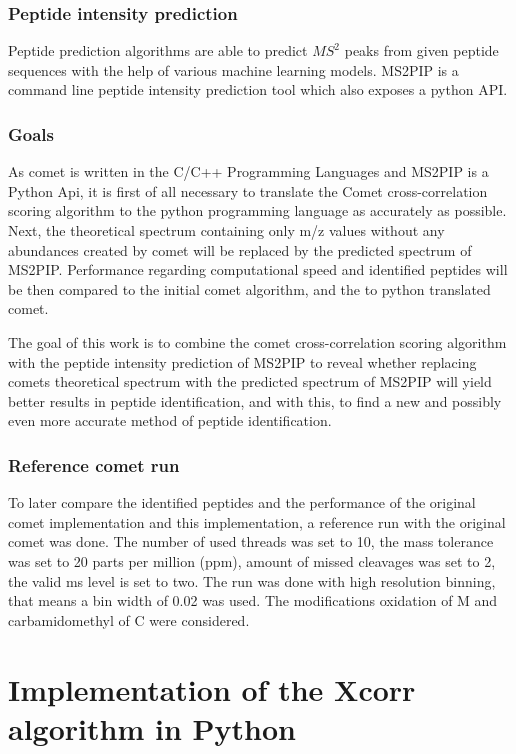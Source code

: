 \documentclass[11pt]{article}
\begin{document}
\subsubsection{Peptide intensity prediction}
Peptide prediction algorithms are able to predict \(MS^2\) peaks from given peptide sequences with the help of various machine learning models. MS2PIP\cite{ms2pip} is a command line peptide intensity prediction tool which also exposes a python API.

\subsubsection{Goals}
As comet is written in the C/C++ Programming Languages and MS2PIP is a Python Api, it is first of all necessary to translate the Comet cross-correlation scoring algorithm to the python programming language as accurately as possible. Next, the theoretical spectrum containing only m/z values without any abundances created by comet will be replaced by the predicted spectrum of MS2PIP. Performance regarding computational speed and identified peptides will be then compared to the initial comet algorithm, and the to python translated comet.

The goal of this work is to combine the comet cross-correlation scoring algorithm
with the peptide intensity prediction of MS2PIP to reveal whether replacing comets theoretical spectrum with the predicted spectrum of MS2PIP will yield better results in peptide identification, and with this, to find a new and possibly even more accurate method of peptide identification.

\subsubsection{Reference comet run}
To later compare the identified peptides and the performance of the original comet implementation and this implementation, a reference run with the original comet was done. The number of used threads was set to 10, the mass tolerance was set to 20 parts per million (ppm), amount of missed cleavages was set to 2, the valid ms level is set to two. The run was done with high resolution binning, that means a bin width of 0.02 was used. The modifications oxidation of M and carbamidomethyl of C were considered.

\section{Implementation of the Xcorr algorithm in Python}
\end{document}
